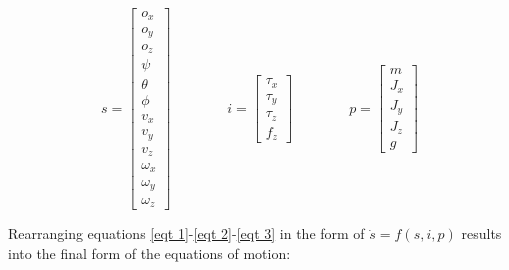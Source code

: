 \begin{equation}
  s = \begin{bmatrix} o_x \\ o_y \\ o_z \\ \psi \\ \theta \\ \phi \\ v_x \\ v_y \\ v_z \\ \omega_x \\ \omega_y \\ \omega_z \end{bmatrix}  
  \qquad\qquad
  i = \begin{bmatrix} \tau_x \\ \tau_y \\ \tau_z \\ f_z \end{bmatrix}  
  \qquad\qquad
  p = \begin{bmatrix} m \\ J_x \\ J_y \\ J_z \\ g \end{bmatrix}
\end{equation}

Rearranging equations \ref{eqt 1}-\ref{eqt 2}-\ref{eqt 3} in the form of $\dot{s} = f(s,i,p)$ results into the final form of the equations of motion:

